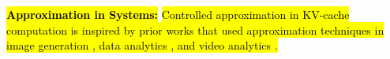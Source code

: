 \noindent\textbf{\hl{Approximation in Systems:}} 
\hl{Controlled approximation in KV-cache computation is inspired by prior works that used approximation techniques in image generation \cite{agarwal2024approximate, li2024distrifusion, ma2024deepcache,lu2024recon}, data analytics \cite{garofalakis2001approximate, park2018verdictdb, agarwal2023fast, ahmad2024scaleviz}, and video analytics \cite{xu2018videochef, zhang2017live}.}




